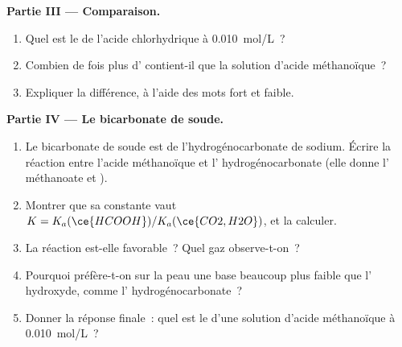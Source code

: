 \begin{problem}
\medskip
\noindent\textbf{Partie III --- Comparaison.}
\begin{enumerate}[resume]
  \item Quel est le  de l'acide chlorhydrique à \qty{0.010}{mol/L}~?
  \item Combien de fois plus d' contient-il que la solution
        d'acide méthanoïque~?
  \item Expliquer la différence, à l'aide des mots fort et faible.
\end{enumerate}

\medskip
\noindent\textbf{Partie IV --- Le bicarbonate de soude.}
\begin{enumerate}[resume]
  \item Le bicarbonate de soude est de l'hydrogénocarbonate de sodium.
        Écrire la réaction entre l'acide méthanoïque et l'
        hydrogénocarbonate (elle donne l' méthanoate et
        ).
  \item Montrer que sa constante vaut $K = K_a(\ce{HCOOH}) / K_a(\ce{CO2,H2O})$,
        et la calculer.
  \item La réaction est-elle favorable~? Quel gaz observe-t-on~?
  \item Pourquoi préfère-t-on sur la peau une base beaucoup plus faible
        que l' hydroxyde, comme l' hydrogénocarbonate~?
  \item Donner la réponse finale~: quel est le  d'une solution d'acide
        méthanoïque à \qty{0.010}{mol/L}~?
\end{enumerate}
\end{problem}
